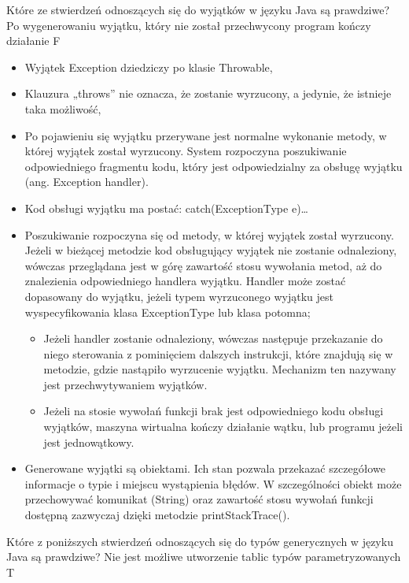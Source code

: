 \answer
{Które ze stwierdzeń odnoszących się do wyjątków w języku Java są prawdziwe?}
{Po wygenerowaniu wyjątku, który nie został przechwycony program kończy działanie}
{F}
{\begin{itemize}
 	\item Wyjątek Exception dziedziczy po klasie Throwable,
  	\item Klauzura „throws” nie oznacza, że zostanie wyrzucony, a jedynie, że istnieje taka możliwość,
  	\item Po pojawieniu się wyjątku przerywane jest normalne wykonanie metody, w której wyjątek został wyrzucony. System rozpoczyna poszukiwanie odpowiedniego fragmentu kodu, który jest odpowiedzialny za obsługę wyjątku (ang. Exception handler).
  	\item Kod obsługi wyjątku ma postać: catch(ExceptionType e){…}
  	\item Poszukiwanie rozpoczyna się od metody, w której wyjątek został wyrzucony. Jeżeli w bieżącej metodzie kod obsługujący wyjątek nie zostanie odnaleziony, wówczas przeglądana jest w górę zawartość stosu wywołania metod, aż do znalezienia odpowiedniego handlera wyjątku. Handler może zostać dopasowany do wyjątku, jeżeli typem wyrzuconego wyjątku jest wyspecyfikowania klasa ExceptionType lub klasa potomna;
	\begin{itemize}
  		\item Jeżeli handler zostanie odnaleziony, wówczas następuje przekazanie do niego sterowania z pominięciem dalszych instrukcji, które znajdują się w metodzie, gdzie nastąpiło wyrzucenie wyjątku. Mechanizm ten nazywany jest przechwytywaniem wyjątków.
  		\item Jeżeli na stosie wywołań funkcji brak jest odpowiedniego kodu obsługi wyjątków, maszyna wirtualna kończy działanie wątku, lub programu jeżeli jest jednowątkowy.
	\end{itemize}
    \item Generowane wyjątki są obiektami. Ich stan pozwala przekazać szczegółowe informacje o typie i miejscu wystąpienia błędów. W szczególności obiekt może przechowywać komunikat (String) oraz zawartość stosu wywołań funkcji dostępną zazwyczaj dzięki metodzie printStackTrace().
\end{itemize}}
{}

\answer
{Które z poniższych stwierdzeń odnoszących się do typów generycznych w języku Java są prawdziwe?}
{Nie jest możliwe utworzenie tablic typów parametryzowanych}
{T}
{}
{}

